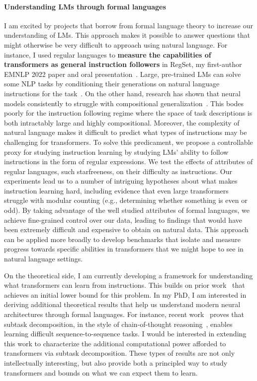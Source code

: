 \documentclass[11pt]{article}
\begin{document}
\paragraph{Understanding LMs through formal languages}

I am excited by projects 
that borrow from formal language theory
to increase our understanding of LMs.
This approach makes it possible to answer 
questions that might otherwise be very difficult to approach using natural language.
For instance, I used regular languages to 
\textbf{measure the capabilities of transformers as general instruction followers}
in RegSet, my first-author EMNLP 2022 paper 
and oral presentation~\cite{Finlayson2022WhatMI}. 
Large, pre-trained LMs can solve some NLP tasks 
by conditioning their generations on natural language instructions 
for the task~\cite{mishra2021crosstask, Wei2021FinetunedLM}. 
On the other hand, 
research has shown that neural models consistently to struggle with
compositional generalization~\cite{Lake2018GeneralizationWS}. 
This bodes poorly for the instruction following regime
where the space of task descriptions is both intractably large 
and highly compositional.
Moreover, the complexity of natural language makes it difficult to
predict what types of instructions may be challenging for transformers.
To solve this predicament, 
we propose a controllable proxy for studying instruction learning
by studying LMs' ability to follow instructions in the form of regular expressions.
We test the effects of attributes of regular languages,
such starfreeness, on their difficulty as instructions.
Our experiments lead us to a number of intriguing hypotheses 
about what makes instruction learning hard, 
including evidence that even large transformers struggle with modular counting 
(e.g., determining whether something is even or odd). 
By taking advantage of the well studied attributes of formal languages,
we achieve fine-grained control over our data, leading to findings that
would have been extremely difficult and expensive to obtain on natural data.
This approach can be applied more broadly to develop benchmarks 
that isolate and measure progress towards specific abilities 
in transformers that we might hope to see in natural language settings.

On the theoretical side, I am currently developing a framework for 
understanding what transformers can learn from instructions. 
This builds on prior work~\cite{Merrill2022LogPrecisionTA}
that achieves an initial lower bound for this problem.
In my PhD, I am interested 
in deriving additional theoretical results 
that help us understand modern neural architectures 
through formal languages.
For instance, recent work~\cite{Wies2022SubTaskDE} 
proves that subtask decomposition,
in the style of chain-of-thought reasoning~\cite{Wei2022ChainOT},
enables learning difficult sequence-to-sequence tasks.
I would be interested in extending this work 
to characterize the additional computational power 
afforded to transformers via subtask decomposition.
These types of results are not only intellectually interesting,
but also provide both a principled way to study transformers 
and bounds on what we can expect them to learn.
\end{document}
